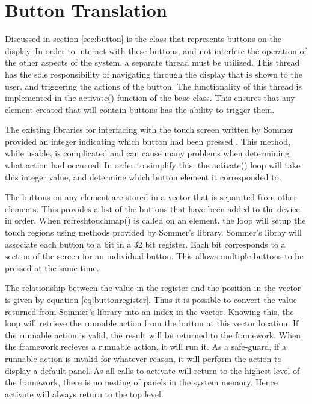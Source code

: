 \section{Button Translation}

Discussed in section \ref{sec:button} is the class that represents buttons on the display. In order to interact with these buttons, and not interfere the operation of the other aspects of the system, a separate thread must be utilized. This thread has the sole responsibility of navigating through the display that is shown to the user, and triggering the actions of the button. The functionality of this thread is implemented in the activate() function of the base class. This ensures that any element created that will contain buttons has the ability to trigger them.

The existing libraries for interfacing with the touch screen written by Sommer provided an integer indicating which button had been pressed \cite{thesis_sommer}. This method, while usable, is complicated and can cause many problems when determining what action had occurred. In order to simplify this, the activate() loop will take this integer value, and determine which button element it corresponded to. 

The buttons on any element are stored in a vector that is separated from other elements. This provides a list of the buttons that have been added to the device in order. When refreshtouchmap() is called on an element, the loop will setup the touch regions using methods provided by Sommer's library. Sommer's libray will associate each button to a bit in a 32 bit register. Each bit corresponds to a section of the screen for an individual button. This allows multiple buttons to be pressed at the same time.

The relationship between the value in the register and the position in the vector is given by equation \ref{eq:buttonregister}. Thus it is possible to convert the value returned from Sommer's library into an index in the vector. Knowing this, the loop will retrieve the runnable action from the button at this vector location. If the runnable action is valid, the result will be returned to the framework. When the framework recieves a runnable action, it will run it. As a safe-guard, if a runnable action is invalid for whatever reason, it will perform the action to display a default panel. As all calls to activate will return to the highest level of the framework, there is no nesting of panels in the system memory. Hence activate will always return to the top level.

